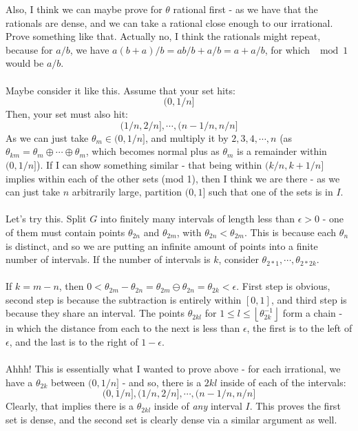 \documentclass[12pt,a4paper]{article}
\newcommand{\1}[1]{\mathbbm{1}\left\{ #1 \right\}}
\newcommand{\floor}[1]{\left\lfloor #1 \right\rfloor}
\begin{document}
\begin{enumerate}
$$	$$
	Also, I think we can maybe prove for $\theta$ rational first - as we have that the rationals are dense, and we can take a rational close enough to our irrational. Prove something like that. Actually no, I think the rationals might repeat, because for $a/b$, we have $a(b + a)/b = ab/b + a/b = a + a/b$, for which $\mod 1$ would be $a/b$. 
	\\\\
	Maybe consider it like this. Assume that your set hits:
	$$
		(0, 1/n]
	$$
	Then, your set must also hit:
	$$
		(1/n,2/n], \cdots, (n-1/n,n/n]
	$$
	As we can just take $\theta_m \in (0,1/n]$, and multiply it by $2,3,4,\cdots,n$ (as $\theta_{km} = \theta_m \oplus \cdots \oplus \theta_m$, which becomes normal plus as $\theta_m$ is a remainder within $(0,1/n]$). If I can show something similar - that being within $(k/n,k+1/n]$ implies within each of the other sets (mod 1), then I think we are there - as we can just take $n$ arbitrarily large, partition $(0,1]$ such that one of the sets is in $I$.
	\\\\
	Let's try this. Split $G$ into finitely many intervals of length less than $\epsilon > 0$ - one of them must contain points $\theta_{2n}$ and $\theta_{2m}$, with $\theta_{2n} < \theta_{2m}$. This is because each $\theta_n$ is distinct, and so we are putting an infinite amount of points into a finite number of intervals. If the number of intervals is $k$, consider $\theta_{2 * 1}, \cdots, \theta_{2 * 2k}$.
	\\\\
	If $k = m - n$, then $0 < \theta_{2m} - \theta_{2n} = \theta_{2m} \ominus \theta_{2n} = \theta_{2k} < \epsilon$. First step is obvious, second step is because the subtraction is entirely within $[0,1]$, and third step is because they share an interval. The points $\theta_{2kl}$ for $1 \leq l \leq \floor{\theta_{2k}^{-1}}$ form a chain - in which the distance from each to the next is less than $\epsilon$, the first is to the left of $\epsilon$, and the last is to the right of $1 - \epsilon$.
	\\\\
	Ahhh! This is essentially what I wanted to prove above - for each irrational, we have a $\theta_{2k}$ between $(0,1/n]$ - and so, there is a $2kl$ inside of each of the intervals: 
	$$
		(0, 1/n], (1/n,2/n], \cdots, (n-1/n,n/n]
	$$
	Clearly, that implies there is a $\theta_{2kl}$ inside of \textit{any} interval $I$. This proves the first set is dense, and the second set is clearly dense via a similar argument as well.
	

\end{enumerate}
\end{document}
